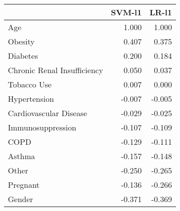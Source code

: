 \begin{tabular}{lrr}
\toprule
{} &  SVM-l1 &  LR-l1 \\
\midrule
Age                         &   1.000 &  1.000 \\
Obesity                     &   0.407 &  0.375 \\
Diabetes                    &   0.200 &  0.184 \\
Chronic Renal Insufficiency &   0.050 &  0.037 \\
Tobacco Use                 &   0.007 &  0.000 \\
Hypertension                &  -0.007 & -0.005 \\
Cardiovascular Disease      &  -0.029 & -0.025 \\
Immunosuppression           &  -0.107 & -0.109 \\
COPD                        &  -0.129 & -0.111 \\
Asthma                      &  -0.157 & -0.148 \\
Other                       &  -0.250 & -0.265 \\
Pregnant                    &  -0.136 & -0.266 \\
Gender                      &  -0.371 & -0.369 \\
\bottomrule
\end{tabular}
